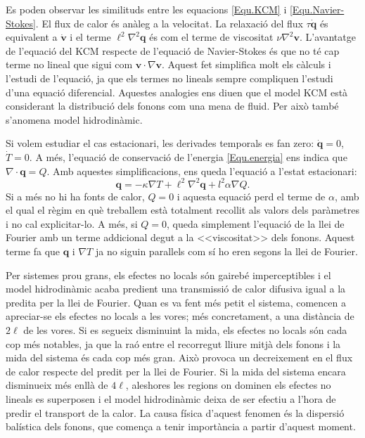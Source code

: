 \documentclass{article}
\begin{document}
Es poden observar les similituds entre les equacions \eqref{Equ.KCM} i \eqref{Equ.Navier-Stokes}. El flux de calor \'{e}s an\`{a}leg a la velocitat. La relaxaci\'{o} del flux $\tau\dot{\boldsymbol{q}}$ \'{e}s equivalent a $\dot{\boldsymbol{v}}$ i el terme $\ell^2\nabla^2\boldsymbol{q}$ \'{e}s com el terme de viscositat $\nu\nabla^2\boldsymbol{v}$. L'avantatge de l'equaci\'{o} del KCM respecte de l'equaci\'{o} de Navier-Stokes \'{e}s que no t\'{e} cap terme no lineal que sigui com $\boldsymbol{v}\cdot\nabla\boldsymbol{v}$. Aquest fet simplifica molt els c\`{a}lculs i l'estudi de l'equaci\'{o}, ja que els termes no lineals sempre compliquen l'estudi d'una equaci\'{o} diferencial. Aquestes analogies ens diuen que el model KCM est\`{a} considerant la distribuci\'{o} dels fonons com una mena de fluid. Per aix\`{o} tamb\'{e} s'anomena model hidrodin\`{a}mic.
\vspace{4mm}

Si volem estudiar el cas estacionari, les derivades temporals es fan zero: $\dot{\boldsymbol{q}}=0$, $\dot T=0$. A m\'{e}s, l'equaci\'{o} de conservaci\'{o} de l'energia \eqref{Equ.energia} ens indica que $\nabla\cdot\boldsymbol{q}=Q$. Amb aquestes simplificacions, ens queda l'equaci\'{o} a l'estat estacionari:
\begin{equation}\label{Equ.estacionari}
\boldsymbol{q}=-\kappa\nabla T+\ell^2\nabla^2\boldsymbol{q}+l^2\alpha\nabla Q.
\end{equation}
Si a m\'{e}s no hi ha fonts de calor, $Q=0$ i aquesta equaci\'{o} perd el terme de $\alpha$, amb el qual el r\`{e}gim en qu\`{e} treballem est\`{a} totalment recollit als valors dels par\`{a}metres i no cal explicitar-lo. A m\'{e}s, si $Q=0$, queda simplement l'equaci\'{o} de la llei de Fourier amb un terme addicional degut a la <<viscositat>> dels fonons. Aquest terme fa que $\boldsymbol{q}$ i $\nabla T$ ja no siguin paral\textperiodcentered lels com s\'{i} ho eren segons la llei de Fourier.
\vspace{4mm}

Per sistemes prou grans, els efectes no locals s\'{o}n gaireb\'{e} imperceptibles i el model hidrodin\`{a}mic acaba predient una transmissi\'{o} de calor difusiva igual a la predita per la llei de Fourier. Quan es va fent m\'{e}s petit el sistema, comencen a apreciar-se els efectes no locals a les vores; m\'{e}s concretament, a una dist\`{a}ncia de $2\ell$ de les vores. Si es segueix disminuint la mida, els efectes no locals s\'{o}n cada cop m\'{e}s notables, ja que la ra\'{o} entre el recorregut lliure mitj\`{a} dels fonons i la mida del sistema \'{e}s cada cop m\'{e}s gran. Aix\`{o} provoca un decreixement en el flux de calor respecte del predit per la llei de Fourier. Si la mida del sistema encara disminueix m\'{e}s enll\`{a} de $4\ell$, aleshores les regions on dominen els efectes no lineals es superposen i el model hidrodin\`{a}mic deixa de ser efectiu a l'hora de predir el transport de la calor. La causa f\'{i}sica d'aquest fenomen \'{e}s la dispersi\'{o} bal\'{i}stica dels fonons, que comen\c{c}a a tenir import\`{a}ncia a partir d'aquest moment.
\end{document}
